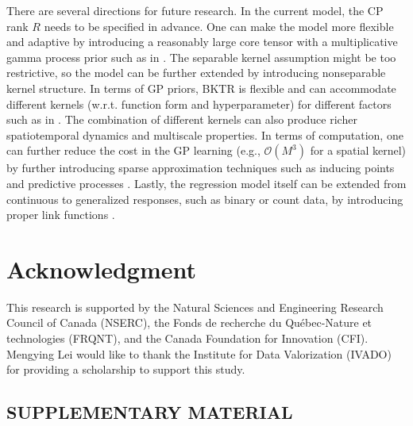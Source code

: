 \documentclass[12pt]{article}
\begin{document}
There are several directions for future research. In the current model, the CP rank $R$ needs to be specified in advance. One can make the model more flexible and adaptive by introducing a reasonably large core tensor with a multiplicative gamma process prior such as in \citet{rai2014scalable}. The separable kernel assumption might be too restrictive, so the model can be further extended by introducing nonseparable kernel structure. In terms of GP priors, BKTR is flexible and can accommodate different kernels (w.r.t. function form and hyperparameter) for different factors such as in \citet{luttinen2009variational}. The combination of different kernels can also produce richer spatiotemporal dynamics and multiscale properties. In terms of computation, one can further reduce the cost in the GP learning (e.g., $\mathcal{O}(M^3)$ for a spatial kernel) by further introducing sparse approximation techniques such as inducing points and predictive processes \citep{quinonero2005unifying,banerjee2014hierarchical}. Lastly, the regression model itself can be extended from continuous to generalized responses, such as binary or count data, by introducing proper link functions  \citep[see e.g.,][]{polson2013bayesian}. 


\section*{Acknowledgment}
This research is supported by the Natural Sciences and Engineering Research Council of Canada (NSERC), the Fonds de recherche du Qu\'ebec-Nature et technologies (FRQNT), and the Canada Foundation for Innovation (CFI). Mengying Lei would like to thank the Institute for Data Valorization (IVADO) for providing a scholarship to support this study.
















\begin{center}
\section*{\large\bf SUPPLEMENTARY MATERIAL}
\end{center}
\renewcommand{\thesubsection}{\Alph{subsection}}
\end{document}
